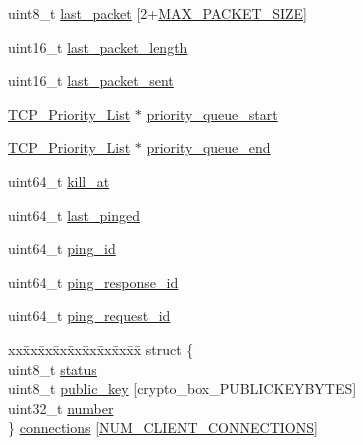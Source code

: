 \begin{DoxyCompactItemize}
\item 
uint8\+\_\+t \hyperlink{struct_t_c_p___client___connection_af7b6d103d243e4267b112f6efe1573e2}{last\+\_\+packet} \mbox{[}2+\hyperlink{_t_c_p__server_8h_a879456c3b8e2853f7044d764e9c180d4}{M\+A\+X\+\_\+\+P\+A\+C\+K\+E\+T\+\_\+\+S\+I\+Z\+E}\mbox{]}
\item 
uint16\+\_\+t \hyperlink{struct_t_c_p___client___connection_a78d503fe4c8d935701480b58a0461775}{last\+\_\+packet\+\_\+length}
\item 
uint16\+\_\+t \hyperlink{struct_t_c_p___client___connection_a80b55fa7d5b8e4c3de6b51c99d7670cc}{last\+\_\+packet\+\_\+sent}
\item 
\hyperlink{struct_t_c_p___priority___list}{T\+C\+P\+\_\+\+Priority\+\_\+\+List} $\ast$ \hyperlink{struct_t_c_p___client___connection_a5e19017835c72dc03d9dfd9a93abeb3c}{priority\+\_\+queue\+\_\+start}
\item 
\hyperlink{struct_t_c_p___priority___list}{T\+C\+P\+\_\+\+Priority\+\_\+\+List} $\ast$ \hyperlink{struct_t_c_p___client___connection_a049dfdaebf54337c3024e077370c62d7}{priority\+\_\+queue\+\_\+end}
\item 
uint64\+\_\+t \hyperlink{struct_t_c_p___client___connection_a2da98b8c0615e4e5fe47dd5f3bdebfab}{kill\+\_\+at}
\item 
uint64\+\_\+t \hyperlink{struct_t_c_p___client___connection_a4049204f6c392628d31be6c39f03e031}{last\+\_\+pinged}
\item 
uint64\+\_\+t \hyperlink{struct_t_c_p___client___connection_acec02fbdff648ca71a6d8e5a0d63d634}{ping\+\_\+id}
\item 
uint64\+\_\+t \hyperlink{struct_t_c_p___client___connection_a39a52d8f19b6b09a91980f9798ec5b50}{ping\+\_\+response\+\_\+id}
\item 
uint64\+\_\+t \hyperlink{struct_t_c_p___client___connection_a8695cc319f7cab1ea66cb80e403d455b}{ping\+\_\+request\+\_\+id}
\item 
\begin{tabbing}
xx\=xx\=xx\=xx\=xx\=xx\=xx\=xx\=xx\=\kill
struct \{\\
\>uint8\_t \hyperlink{struct_t_c_p___client___connection_ade818037fd6c985038ff29656089758d}{status}\\
\>uint8\_t \hyperlink{struct_t_c_p___client___connection_aaa806bb1136fb3d4b5d8d8970b596ff7}{public\_key} \mbox{[}crypto\_box\_PUBLICKEYBYTES\mbox{]}\\
\>uint32\_t \hyperlink{struct_t_c_p___client___connection_ad50c630d233a71112a7df136970caefc}{number}\\
\} \hyperlink{struct_t_c_p___client___connection_a5b7b7af3e8287597e380502eb776cd7a}{connections} \mbox{[}\hyperlink{_t_c_p__server_8h_aad3362495a10d80b0edac21c8f896ae1}{NUM\_CLIENT\_CONNECTIONS}\mbox{]}\\


\end{tabbing}
\end{DoxyCompactItemize}
